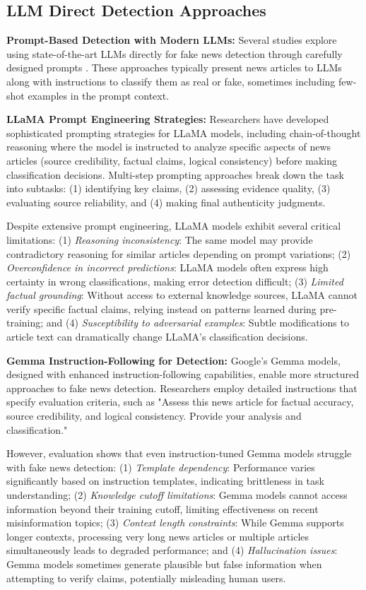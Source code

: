 \subsection{LLM Direct Detection Approaches}

\textbf{Prompt-Based Detection with Modern LLMs:} Several studies explore using state-of-the-art LLMs directly for fake news detection through carefully designed prompts \cite{chen2023chatgpt, bang2023multitask}. These approaches typically present news articles to LLMs along with instructions to classify them as real or fake, sometimes including few-shot examples in the prompt context.

\textbf{LLaMA Prompt Engineering Strategies:} Researchers have developed sophisticated prompting strategies for LLaMA models, including chain-of-thought reasoning where the model is instructed to analyze specific aspects of news articles (source credibility, factual claims, logical consistency) before making classification decisions. Multi-step prompting approaches break down the task into subtasks: (1) identifying key claims, (2) assessing evidence quality, (3) evaluating source reliability, and (4) making final authenticity judgments.

Despite extensive prompt engineering, LLaMA models exhibit several critical limitations: (1) \emph{Reasoning inconsistency}: The same model may provide contradictory reasoning for similar articles depending on prompt variations; (2) \emph{Overconfidence in incorrect predictions}: LLaMA models often express high certainty in wrong classifications, making error detection difficult; (3) \emph{Limited factual grounding}: Without access to external knowledge sources, LLaMA cannot verify specific factual claims, relying instead on patterns learned during pre-training; and (4) \emph{Susceptibility to adversarial examples}: Subtle modifications to article text can dramatically change LLaMA's classification decisions.

\textbf{Gemma Instruction-Following for Detection:} Google's Gemma models, designed with enhanced instruction-following capabilities, enable more structured approaches to fake news detection. Researchers employ detailed instructions that specify evaluation criteria, such as "Assess this news article for factual accuracy, source credibility, and logical consistency. Provide your analysis and classification."

However, evaluation shows that even instruction-tuned Gemma models struggle with fake news detection: (1) \emph{Template dependency}: Performance varies significantly based on instruction templates, indicating brittleness in task understanding; (2) \emph{Knowledge cutoff limitations}: Gemma models cannot access information beyond their training cutoff, limiting effectiveness on recent misinformation topics; (3) \emph{Context length constraints}: While Gemma supports longer contexts, processing very long news articles or multiple articles simultaneously leads to degraded performance; and (4) \emph{Hallucination issues}: Gemma models sometimes generate plausible but false information when attempting to verify claims, potentially misleading human users.

